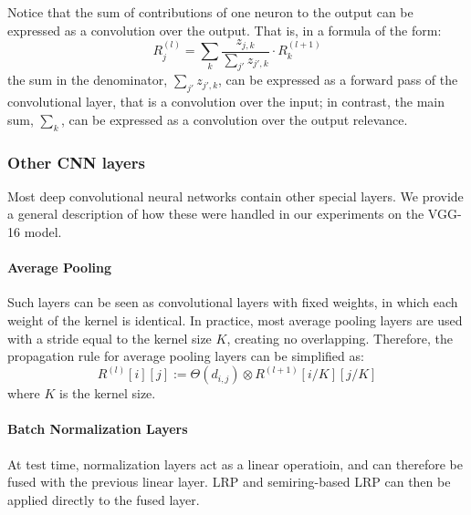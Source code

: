\documentclass{../cs-classes/cs-classes}
\newcommand*{\1}{\digitsbb{1}}
\newcommand*{\0}{\digitsbb{0}}
\begin{document}
Notice that the sum of contributions of one neuron to the output can be expressed as a convolution over the output. That is, in a formula of the form:
\begin{equation*}
    R_j^{(l)} = \sum_k \frac{z_{j,k}}{\sum_{j'}z_{j',k}} \cdot R_k^{(l+1)}
\end{equation*}
the sum in the denominator, $\sum_{j'}z_{j',k}$, can be expressed as a forward pass of the convolutional layer, that is a convolution over the input; in contrast, the main sum, $\sum_k$, can be expressed as a convolution over the output relevance.


\subsubsection{Other CNN layers}
Most deep convolutional neural networks contain other special layers. We provide a general description of how these were handled in our experiments on the VGG-16 model.

\paragraph*{Average Pooling}
Such layers can be seen as convolutional layers with fixed weights, in which each weight of the kernel is identical. In practice, most average pooling layers are used with a stride equal to the kernel size $K$, creating no overlapping. Therefore, the propagation rule for average pooling layers can be simplified as:
\begin{equation}
    R^{(l)}[i][j] := \Theta(d_{i,j}) \otimes R^{(l+1)}[i/K][j/K]
\end{equation}
where $K$ is the kernel size.

\paragraph*{Batch Normalization Layers}
At test time, normalization layers act as a linear operatioin, and can therefore be fused with the previous linear layer. LRP and semiring-based LRP can then be applied directly to the fused layer.
\end{document}
